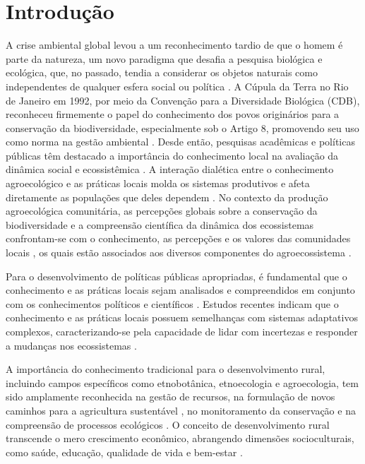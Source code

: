 \pagestyle{plain}
\chapter{Introdução}

A crise ambiental global levou a um reconhecimento tardio de que o homem é parte da natureza, um novo paradigma que desafia a pesquisa biológica e ecológica, que, no passado, tendia a considerar os objetos naturais como independentes de qualquer esfera social ou política \cite{Fletcher2021}. A Cúpula da Terra no Rio de Janeiro em 1992, por meio da Convenção para a Diversidade Biológica (CDB), reconheceu firmemente o papel do conhecimento dos povos originários para a conservação da biodiversidade, especialmente sob o Artigo 8, promovendo seu uso como norma na gestão ambiental \cite{Mekonen2017}.
Desde então, pesquisas acadêmicas e políticas públicas têm destacado a importância do conhecimento local na avaliação da dinâmica social e ecossistêmica \cite{Mantyka-Pringle2017}. A interação dialética entre o conhecimento agroecológico e as práticas locais molda os sistemas produtivos e afeta diretamente as populações que deles dependem \cite{Olsson2001}. No contexto da produção agroecológica comunitária, as percepções globais sobre a conservação da biodiversidade e a compreensão científica da dinâmica dos ecossistemas confrontam-se com o conhecimento, as percepções e os valores das comunidades locais \cite{Thorn2020}, os quais estão associados aos diversos componentes do agroecossistema \cite{Vega2023}.

Para o desenvolvimento de políticas públicas apropriadas, é fundamental que o conhecimento e as práticas locais sejam analisados e compreendidos em conjunto com os conhecimentos políticos e científicos \cite{Morin-Labatut1992} \cite{Akhtar1992}. Estudos recentes indicam que o conhecimento e as práticas locais possuem semelhanças com sistemas adaptativos complexos, caracterizando-se pela capacidade de lidar com incertezas e responder a mudanças nos ecossistemas \cite{Mistry2016}.

A importância do conhecimento tradicional para o desenvolvimento rural, incluindo campos específicos como etnobotânica, etnoecologia e agroecologia, tem sido amplamente reconhecida na gestão de recursos, na formulação de novos caminhos para a agricultura sustentável \cite{Anderson2007}, no monitoramento da conservação e na compreensão de processos ecológicos \cite{Purwanto2022}. O conceito de desenvolvimento rural transcende o mero crescimento econômico, abrangendo dimensões socioculturais, como saúde, educação, qualidade de vida e bem-estar \cite{Bokic2014}.

